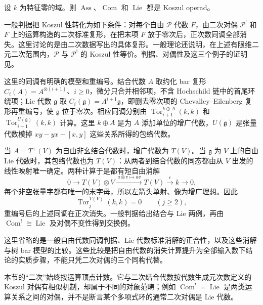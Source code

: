 \begin{theorem}\label{b4:thm:classical-koszul-operads}
	设 \(k\) 为特征零的域。则 \(\operatorname{Ass}\)、\(\operatorname{Com}\) 和 \(\operatorname{Lie}\) 都是 Koszul operad。
\end{theorem}
\begin{proofsketch}
	一般判据把 Koszul 性转化为如下条件：对每个自由 \(\mathcal P\) 代数 \(F\)，由二次对偶 \(\mathcal P^!\) 和 \(F\) 上的运算构造的二次标准复形，在把末项 \(F\) 放于零次后，正次数同调全部消失。这里讨论的是由二次数据写出的具体复形。一般理论还说明，在上述有限维二元二次范围内，\(\mathcal P\) 与 \(\mathcal P^!\) 的 Koszul 性等价。判据、对偶性及这三个例子的证明见\cite[Proposition 4.1.4; Theorem 4.2.5; Corollary 4.2.7]{GinzburgKapranov1994KoszulOperads}。

	这里的同调有明确的模型和重编号。结合代数 \(A\) 取约化 bar 复形 \(C_i(A)=A^{\otimes(i+1)}\)、\(i\ge0\)，微分只合并相邻项，不含 Hochschild 链中的首尾环绕项；Lie 代数 \(\mathfrak g\) 取 \(C_i(\mathfrak g)=\Lambda^{i+1}\mathfrak g\)，即删去零次项的 Chevalley--Eilenberg 复形再重编号，使 \(\mathfrak g\) 位于零次。相应同调分别由 \(\operatorname{Tor}_{i+1}^{k\oplus A}(k,k)\) 和 \(\operatorname{Tor}_{i+1}^{U(\mathfrak g)}(k,k)\) 计算。这里 \(k\oplus A\) 是为 \(A\) 添加单位的增广代数，\(U(\mathfrak g)\) 是张量代数模掉 \(xy-yx-[x,y]\) 这些关系所得的包络代数。

	当 \(A=T^+(V)\) 为自由非幺结合代数时，增广代数为 \(T(V)\)。当 \(\mathfrak g\) 为 \(V\) 上的自由 Lie 代数时，其包络代数也为 \(T(V)\)：从两者到结合代数的同态都由从 \(V\) 出发的线性映射唯一确定。两种计算于是都有短自由消解
	\[
		0\longrightarrow T(V)\otimes V\xrightarrow{\ a\otimes v\mapsto av\ }T(V)
		\xrightarrow{\ \epsilon\ }k\longrightarrow0.
	\]
	每个非空张量字都有唯一的末字母，所以左箭头单射、像为增广理想。因此
	\[
		\operatorname{Tor}_j^{T(V)}(k,k)=0\qquad(j\ge2),
	\]
	重编号后的上述同调在正次消失。一般判据给出结合与 Lie 两例，再由 \(\operatorname{Com}^!\cong\operatorname{Lie}\) 及对偶不变性得到交换例。

	这里省略的是一般自由代数同调判据、Lie 代数标准消解的正合性，以及这些消解与树 bar 模型的比较。这些比较是把自由代数的消失计算提升为全部输入数下结论的实质步骤，不能只凭二次对偶的三个同构代替。
\end{proofsketch}

本节的“二次”始终按运算顶点计数。它与二次结合代数按代数生成元次数定义的 Koszul 对偶有相似机制，却属于不同的对象范畴；例如 \(\operatorname{Com}^!=\operatorname{Lie}\) 是两类运算关系之间的对偶，并不是断言某个多项式环的通常二次对偶是 Lie 代数。
